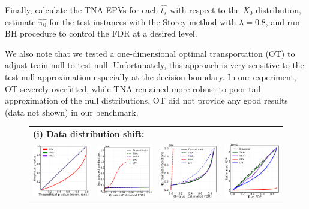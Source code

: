 \documentclass{article}
\begin{document}
	Finally, calculate the TNA EPVs for each $\hat{t_s}$ with respect to the $X_0$ distribution, estimate  $\hat{\pi_0}$ for the test instances with the Storey method with $\lambda= 0.8$, and run BH procedure to control the FDR at a desired level. 
	
	We also note that we tested a one-dimensional optimal transportation (OT) to adjust train null to test null. Unfortunately, this approach is very sensitive to the test null approximation especially at the decision boundary. In our experiment, OT severely overfitted, while TNA remained more robust to poor tail approximation of the null distributions. OT did not provide any good results (data not shown) in our benchmark. 
	

\begin{figure}[h!]
	\centering
	\begin{tabular}{cccc}
		\multicolumn{4}{l}{\bf (i) Data distribution shift:}\\
		\includegraphics[width=0.225\linewidth, height=0.225\linewidth]{img/cnn_QQ_shifted.png}&
		\includegraphics[width=0.225\linewidth, height=0.225\linewidth]{img/cnn_shifted_fdr_control_loc.png} &
		\includegraphics[width=0.225\linewidth, height=0.225\linewidth]{img/cnn_shifted_fdr_control.png} & 
		\includegraphics[width=0.225\linewidth, height=0.225\linewidth]{img/cnn_FDPscat_shifted.png} \\

\end{tabular}
\end{figure}
\end{document}
